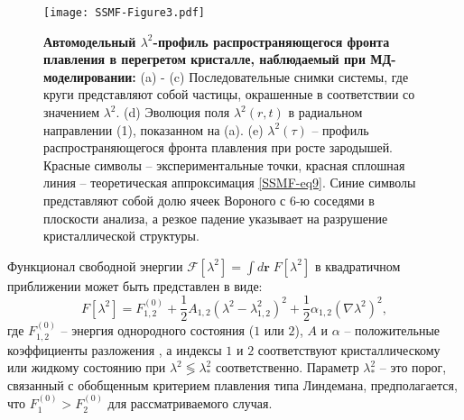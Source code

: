 \begin{figure*}[!t]
  \centering
  \texttt{[image: SSMF-Figure3.pdf]}
  \caption{\textbf{Автомодельный $ \lambda^2$-профиль распространяющегося фронта плавления в перегретом кристалле, наблюдаемый при МД-моделировании:}
    (a) - (c) Последовательные снимки системы, где круги представляют собой частицы, окрашенные в соответствии со значением $\lambda^2$.
    (d) Эволюция поля $\lambda^2(r, t)$ в радиальном направлении (1), показанном на (a).
    (e) $\lambda^2(\tau)$ -- профиль распространяющегося фронта плавления при росте зародышей.
    Красные символы -- экспериментальные точки, красная сплошная линия -- теоретическая аппроксимация \eqref{SSMF-eq9}.
    Синие символы представляют собой долю ячеек Вороного с 6-ю соседями в плоскости анализа, а резкое падение указывает на разрушение кристаллической структуры.}
  \label{SSMF-Figure3}
\end{figure*}

Функционал свободной энергии $\mathcal{F}[\lambda^2] = \int{d\mathbf{r}\;F[\lambda^2]}$ в квадратичном приближении может быть представлен в виде:
\begin{equation}
  \label{SSMF-eq5}
  F[\lambda^2] = F_{\mathrm{1,2}}^{(0)}+\frac{1}{2}A_{1,2}\left(\lambda^2-\lambda_{1,2}^2\right)^2 + \frac{1}{2}\alpha_{1,2}\left(\nabla\lambda^2\right)^2,
\end{equation}
где $F_{1,2}^{(0)}$ -- энергия однородного состояния ($1$ или $2$), $A$ и $\alpha$ -- положительные коэффициенты разложения \cite{book.desai}, а индексы $ 1 $ и $ 2 $ соответствуют кристаллическому или жидкому состоянию при $\lambda^2 \lessgtr \lambda_\ast^2$ соответственно.
Параметр $\lambda_\ast^2 $ -- это порог, связанный с обобщенным критерием плавления типа Линдемана, предполагается, что $ F_{\mathrm{1}} ^ {(0)}> F_{\mathrm{2}} ^ {(0)}$ для рассматриваемого случая.

